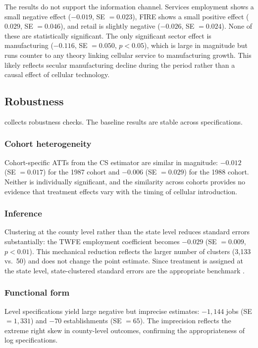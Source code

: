 \documentclass[12pt]{article}
\begin{document}
The results do not support the information channel. Services employment shows a small negative effect ($-0.019$, SE $= 0.023$), FIRE shows a small positive effect ($0.029$, SE $= 0.046$), and retail is slightly negative ($-0.026$, SE $= 0.024$). None of these are statistically significant. The only significant sector effect is manufacturing ($-0.116$, SE $= 0.050$, $p < 0.05$), which is large in magnitude but runs counter to any theory linking cellular service to manufacturing growth. This likely reflects secular manufacturing decline during the period rather than a causal effect of cellular technology.



\subsection{Robustness}

 collects robustness checks. The baseline results are stable across specifications.

\subsubsection*{Cohort heterogeneity} Cohort-specific ATTs from the CS estimator are similar in magnitude: $-0.012$ (SE $= 0.017$) for the 1987 cohort and $-0.006$ (SE $= 0.029$) for the 1988 cohort. Neither is individually significant, and the similarity across cohorts provides no evidence that treatment effects vary with the timing of cellular introduction.

\subsubsection*{Inference} Clustering at the county level rather than the state level reduces standard errors substantially: the TWFE employment coefficient becomes $-0.029$ (SE $= 0.009$, $p < 0.01$). This mechanical reduction reflects the larger number of clusters (3,133 vs.\ 50) and does not change the point estimate. Since treatment is assigned at the state level, state-clustered standard errors are the appropriate benchmark \citep{abadie2023}.

\subsubsection*{Functional form} Level specifications yield large negative but imprecise estimates: $-1,144$ jobs (SE $= 1,331$) and $-70$ establishments (SE $= 65$). The imprecision reflects the extreme right skew in county-level outcomes, confirming the appropriateness of log specifications.
\end{document}
